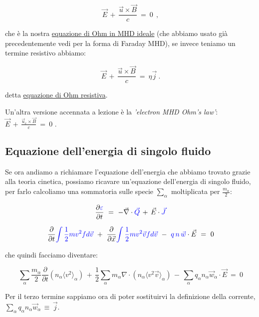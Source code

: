\begin{equation}
	\label{Ohm scema}
	\boxed{\vec E\, +\, \frac{\vec u\times \vec B}{c}\ =\ 0}\ \ ,
\end{equation}

che è la nostra \underline{equazione di Ohm in MHD ideale} (che abbiamo usato già precedentemente vedi per la forma di Faraday MHD), se invece teniamo un termine resistivo abbiamo:

\begin{equation}
	\label{Ohm resistiva}
	\vec E\, +\, \frac{\vec u\times \vec B}{c}\ =\ \eta \vec j \ .
\end{equation}

detta \underline{equazione di Ohm resistiva}.

Un'altra versione accennata a lezione è la \emph{'electron MHD Ohm's law'}: $\vec E\, +\, \frac{\vec u_e\times \vec B}{c}\ =\ 0$ .


%
%
\vspace{0.5cm}
\subsection{Equazione dell'energia di singolo fluido}
Se ora andiamo a richiamare l'equazione dell'energia che abbiamo trovato grazie alla teoria cinetica, possiamo ricavare un'equazione dell'energia di singolo fluido, per farlo calcoliamo una sommatoria sulle specie $\sum_\alpha$ moltiplicata per $\frac{m_\alpha}{2}$:

\[ \frac{\partial \color{blue}{\varepsilon}}{\partial t}\ =\ -\vec \nabla\cdot \color{blue}{\vec Q} \color{black}\, +\, \vec E\cdot\color{blue}{\vec J} \]

\[ \frac{\partial}{\partial t} \color{blue}{\int \frac{1}{2} m v^2 f d\vec v} \color{black}\ +\  \frac{\partial}{\partial\vec x} \color{blue}{\int\frac{1}{2}m v^2 \vec v f d\vec v} \color{black}\ -\ \color{blue}{q\, n\,\vec w} \color{black} \cdot \vec E\ =\ 0\]

che quindi facciamo diventare:

\[\sum_\alpha \frac{m_\alpha}{2} \frac{\partial}{\partial t} (n_\alpha \langle v^2 \rangle_\alpha)\, +\,\frac{1}{2} \sum_\alpha m_\alpha \nabla \cdot (n_\alpha \langle v^2 \vec v\rangle_\alpha)\, -\, \sum_\alpha q_\alpha n_\alpha \vec w_\alpha \cdot \vec E\ =\ 0\]


Per il terzo termine sappiamo ora di poter sostituirvi la definizione della corrente, $\sum_\alpha q_\alpha n_\alpha \vec w_\alpha\, \equiv\, \vec j$. 


